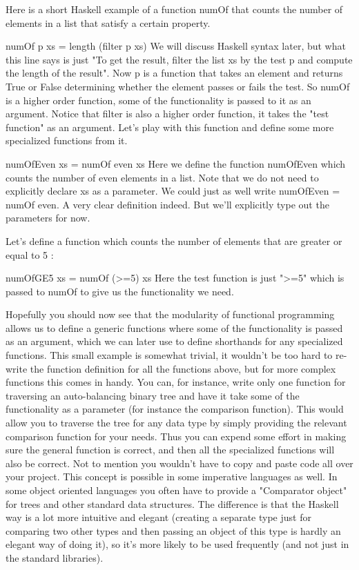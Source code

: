 \documentclass{report}
\begin{document}
Here is a short Haskell example of a function numOf that counts the number of elements in a list that satisfy a certain property.

numOf p xs = length (filter p xs)
We will discuss Haskell syntax later, but what this line says is just "To get the result, filter the list xs by the test p and compute the length of the result". Now p is a function that takes an element and returns True or False determining whether the element passes or fails the test. So numOf is a higher order function, some of the functionality is passed to it as an argument. Notice that filter is also a higher order function, it takes the "test function" as an argument. Let's play with this function and define some more specialized functions from it.

numOfEven xs = numOf even xs
Here we define the function numOfEven which counts the number of even elements in a list. Note that we do not need to explicitly declare xs as a parameter. We could just as well write numOfEven = numOf even. A very clear definition indeed. But we'll explicitly type out the parameters for now.

Let's define a function which counts the number of elements that are greater or equal to 5 :

numOfGE5 xs = numOf (>=5) xs
Here the test function is just ">=5" which is passed to numOf to give us the functionality we need.

Hopefully you should now see that the modularity of functional programming allows us to define a generic functions where some of the functionality is passed as an argument, which we can later use to define shorthands for any specialized functions. This small example is somewhat trivial, it wouldn't be too hard to re-write the function definition for all the functions above, but for more complex functions this comes in handy. You can, for instance, write only one function for traversing an auto-balancing binary tree and have it take some of the functionality as a parameter (for instance the comparison function). This would allow you to traverse the tree for any data type by simply providing the relevant comparison function for your needs. Thus you can expend some effort in making sure the general function is correct, and then all the specialized functions will also be correct. Not to mention you wouldn't have to copy and paste code all over your project. This concept is possible in some imperative languages as well. In some object oriented languages you often have to provide a "Comparator object" for trees and other standard data structures. The difference is that the Haskell way is a lot more intuitive and elegant (creating a separate type just for comparing two other types and then passing an object of this type is hardly an elegant way of doing it), so it's more likely to be used frequently (and not just in the standard libraries).
\end{document}
